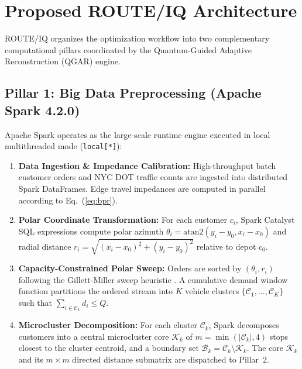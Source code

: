 \documentclass[journal,10pt]{IEEEtran}
\begin{document}
\section{Proposed ROUTE/IQ Architecture}
ROUTE/IQ organizes the optimization workflow into two complementary computational pillars coordinated by the Quantum-Guided Adaptive Reconstruction (QGAR) engine.

\subsection{Pillar 1: Big Data Preprocessing (Apache Spark 4.2.0)}
Apache Spark operates as the large-scale runtime engine executed in local multithreaded mode (\texttt{local[*]}):
\begin{enumerate}
    \item \textbf{Data Ingestion \& Impedance Calibration:} High-throughput batch customer orders and NYC DOT traffic counts are ingested into distributed Spark DataFrames. Edge travel impedances are computed in parallel according to Eq.~(\ref{eq:bpr}).
    \item \textbf{Polar Coordinate Transformation:} For each customer $c_i$, Spark Catalyst SQL expressions compute polar azimuth $\theta_i = \text{atan2}(y_i - y_0, x_i - x_0)$ and radial distance $r_i = \sqrt{(x_i - x_0)^2 + (y_i - y_0)^2}$ relative to depot $c_0$.
    \item \textbf{Capacity-Constrained Polar Sweep:} Orders are sorted by $(\theta_i, r_i)$ following the Gillett-Miller sweep heuristic \cite{gillett1974sweep}. A cumulative demand window function partitions the ordered stream into $K$ vehicle clusters $\{\mathcal{C}_1, \dots, \mathcal{C}_K\}$ such that $\sum_{i \in \mathcal{C}_k} d_i \le Q$.
    \item \textbf{Microcluster Decomposition:} For each cluster $\mathcal{C}_k$, Spark decomposes customers into a central microcluster core $\mathcal{K}_k$ of $m = \min(|\mathcal{C}_k|, 4)$ stops closest to the cluster centroid, and a boundary set $\mathcal{B}_k = \mathcal{C}_k \setminus \mathcal{K}_k$. The core $\mathcal{K}_k$ and its $m \times m$ directed distance submatrix are dispatched to Pillar~2.
\end{enumerate}
\end{document}
